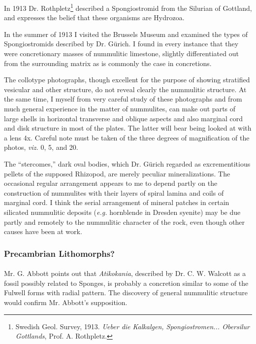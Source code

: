 \documentclass[a4paper, 12pt, oneside]{article}
\begin{document}
In 1913 Dr. Rothpletz\footnote{Swedish Geol. Survey, 1913. \emph{Ueber die Kalkalgen, Spongiostromen... Obersilur Gottlands}, Prof. A. Rothpletz.} described a Spongiostromid from the Silurian of Gottland, and expresses the belief that these organisms are Hydrozoa.

In the summer of 1913 I visited the Brussels Museum and examined the types of Spongiostromids described by Dr. Gürich. I found in every instance that they were concretionary masses of nummulitic limestone, slightly differentiated out from the surrounding matrix as is commonly the case in concretions.

The collotype photographs, though excellent for the purpose of showing stratified vesicular and other structure, do not reveal clearly the nummulitic structure. At the same time, I myself from very careful study of these photographs and from much general experience in the matter of nummulites, can make out parts of large shells in horizontal transverse and oblique aspects and also marginal cord and disk structure in most of the plates. The latter will bear being looked at with a lens 4x. Careful note must be taken of the three degrees of magnification of the photos, \emph{viz.} 0, 5, and 20.

The ``stercomes,'' dark oval bodies, which Dr. Gürich regarded as excrementitious pellets of the supposed Rhizopod, are merely peculiar mineralizations. The occasional regular arrangement appears to me to depend partly on the construction of nummulites with their layers of spiral lamina and coils of marginal cord. I think the serial arrangement of mineral patches in certain silicated nummulitic deposits (\emph{e.g.} hornblende in Dresden syenite) may be due partly and remotely to the nummulitic character of the rock, even though other causes have been at work.

\subsubsection{Precambrian Lithomorphs?}
\paragraph{}
Mr. G. Abbott points out that \emph{Atikokania}, described by Dr. C. W. Walcott as a fossil possibly related to Sponges, is probably a concretion similar to some of the Fulwell forms with radial pattern. The discovery of general nummulitic structure would confirm Mr. Abbott's supposition.
\end{document}

